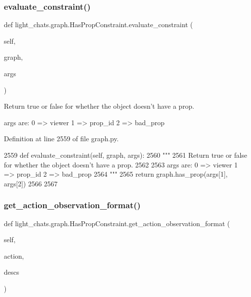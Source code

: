 \subsubsection{\texorpdfstring{evaluate\+\_\+constraint()}{evaluate\_constraint()}}
{\footnotesize\ttfamily def light\+\_\+chats.\+graph.\+Has\+Prop\+Constraint.\+evaluate\+\_\+constraint (\begin{DoxyParamCaption}\item[{}]{self,  }\item[{}]{graph,  }\item[{}]{args }\end{DoxyParamCaption})}

\begin{DoxyVerb}Return true or false for whether the object doesn't have a prop.

args are:     0 => viewer     1 => prop_id     2 => bad_prop
\end{DoxyVerb}
 

Definition at line 2559 of file graph.\+py.


\begin{DoxyCode}
2559     \textcolor{keyword}{def }evaluate\_constraint(self, graph, args):
2560         \textcolor{stringliteral}{"""}
2561 \textcolor{stringliteral}{        Return true or false for whether the object doesn't have a prop.}
2562 \textcolor{stringliteral}{}
2563 \textcolor{stringliteral}{        args are:     0 => viewer     1 => prop\_id     2 => bad\_prop}
2564 \textcolor{stringliteral}{        """}
2565         \textcolor{keywordflow}{return} graph.has\_prop(args[1], args[2])
2566 
2567 
\end{DoxyCode}
\mbox{\label{classlight__chats_1_1graph_1_1HasPropConstraint_a306f2581a6d32cec3edd07fda539429a}} 
\subsubsection{\texorpdfstring{get\+\_\+action\+\_\+observation\+\_\+format()}{get\_action\_observation\_format()}}
{\footnotesize\ttfamily def light\+\_\+chats.\+graph.\+Has\+Prop\+Constraint.\+get\+\_\+action\+\_\+observation\+\_\+format (\begin{DoxyParamCaption}\item[{}]{self,  }\item[{}]{action,  }\item[{}]{descs }\end{DoxyParamCaption})}



